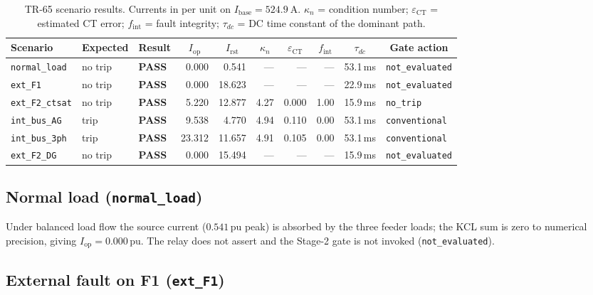 \documentclass[12pt,a4paper]{article}
\newcommand{\PASS}{\textcolor{passgreen}{\textbf{PASS}}}
\newcommand{\kappan}{\kappa_n}
\newcommand{\Iop}{I_{\mathrm{op}}}
\newcommand{\Irst}{I_{\mathrm{rst}}}
\newcommand{\fint}{f_{\mathrm{int}}}
\newcommand{\eCT}{\varepsilon_{\mathrm{CT}}}
\begin{document}
\begin{table}[H]
\centering
\caption{TR-65 scenario results.  Currents in per unit on
  $I_{\mathrm{base}}=\SI{524.9}{\ampere}$.
  $\kappan$ = condition number; $\eCT$ = estimated CT error; $\fint$ = fault
  integrity; $\tau_{dc}$ = DC time constant of the dominant path.}
\label{tab:results}
\setlength{\tabcolsep}{5pt}
\begin{tabular}{lllrrrrrrl}
\toprule
Scenario
  & \multicolumn{1}{c}{Expected}
  & \multicolumn{1}{c}{Result}
  & \multicolumn{1}{c}{$\Iop$}
  & \multicolumn{1}{c}{$\Irst$}
  & \multicolumn{1}{c}{$\kappan$}
  & \multicolumn{1}{c}{$\eCT$}
  & \multicolumn{1}{c}{$\fint$}
  & \multicolumn{1}{c}{$\tau_{dc}$}
  & \multicolumn{1}{c}{Gate action} \\
\midrule
\texttt{normal\_load}
  & no trip & \PASS & 0.000 & 0.541 & ---   & ---   & ---  & 53.1\,ms
  & \texttt{not\_evaluated} \\
\texttt{ext\_F1}
  & no trip & \PASS & 0.000 & 18.623 & ---  & ---   & ---  & 22.9\,ms
  & \texttt{not\_evaluated} \\
\texttt{ext\_F2\_ctsat}
  & no trip & \PASS & 5.220 & 12.877 & 4.27 & 0.000 & 1.00 & 15.9\,ms
  & \texttt{no\_trip} \\
\texttt{int\_bus\_AG}
  & trip     & \PASS & 9.538 & 4.770  & 4.94 & 0.110 & 0.00 & 53.1\,ms
  & \texttt{conventional} \\
\texttt{int\_bus\_3ph}
  & trip     & \PASS & 23.312 & 11.657 & 4.91 & 0.105 & 0.00 & 53.1\,ms
  & \texttt{conventional} \\
\texttt{ext\_F2\_DG}
  & no trip & \PASS & 0.000 & 15.494 & ---  & ---   & ---  & 15.9\,ms
  & \texttt{not\_evaluated} \\
\bottomrule
\end{tabular}
\end{table}

\subsection{Normal load (\texttt{normal\_load})}
\label{sec:normal}

Under balanced load flow the source current ($0.541\,\mathrm{pu}$ peak) is
absorbed by the three feeder loads; the KCL sum is zero to numerical precision,
giving $\Iop = 0.000\,\mathrm{pu}$.  The relay does not assert and the
Stage-2 gate is not invoked (\texttt{not\_evaluated}).

\subsection{External fault on F1 (\texttt{ext\_F1})}
\label{sec:extF1}
\end{document}
